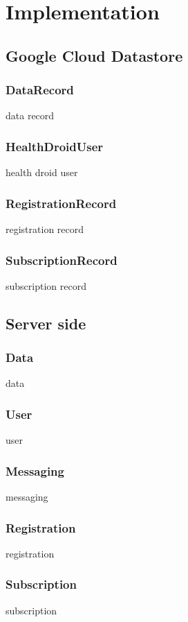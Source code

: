 \section{Implementation}
\subsection{Google Cloud Datastore}
\subsubsection{DataRecord}
data record

\subsubsection{HealthDroidUser}
health droid user

\subsubsection{RegistrationRecord}
registration record

\subsubsection{SubscriptionRecord}
subscription record

\subsection{Server side}
\subsubsection{Data}
data

\subsubsection{User}
user

\subsubsection{Messaging}
messaging

\subsubsection{Registration}
registration

\subsubsection{Subscription}
subscription

